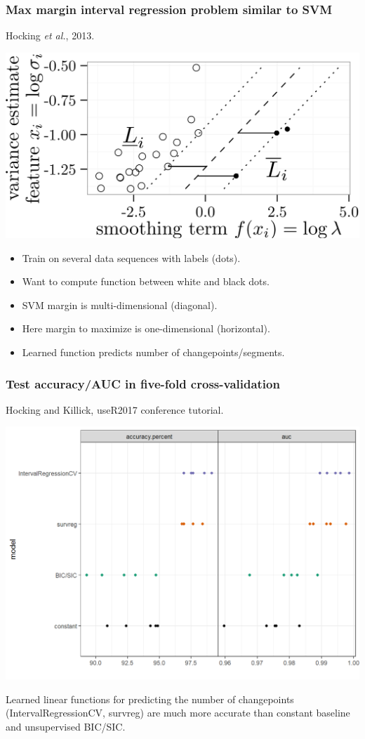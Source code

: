 \documentclass{beamer}
\begin{document}
\begin{frame}
  \frametitle{Max margin interval regression problem similar to SVM}
  Hocking \emph{et al.}, 2013.

  \includegraphics[width=0.8\linewidth]{icml13-hard-margin}
  \begin{itemize}
  \item Train on several data sequences with labels (dots).
  \item Want to compute function between white and black dots.
  \item SVM margin is multi-dimensional (diagonal).
  \item Here margin to maximize is one-dimensional (horizontal).
  \item Learned function predicts number of changepoints/segments.
  \end{itemize}
\end{frame}

\begin{frame}
  \frametitle{Test accuracy/AUC in five-fold cross-validation}
  
  Hocking and Killick, useR2017 conference tutorial.

  \includegraphics[width=0.8\linewidth]{supervised-test-metrics}

  Learned linear functions for predicting the number of changepoints
  (IntervalRegressionCV, survreg) are much more accurate than constant
  baseline and unsupervised BIC/SIC.
  
\end{frame}
\end{document}
